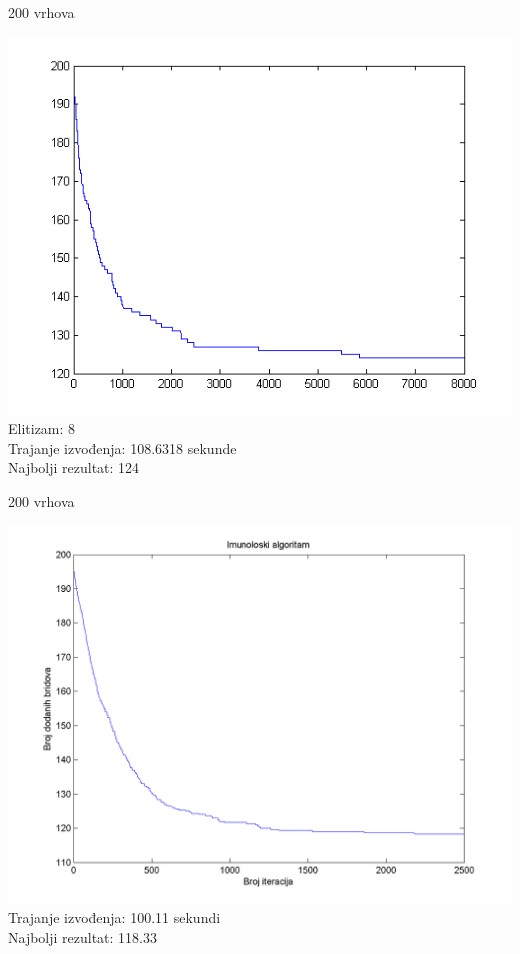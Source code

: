 \documentclass{beamer}
\begin{document}
\begin{frame}{200 vrhova}
\begin{center}
\includegraphics[scale = 0.55]{par8.png}\\
\tiny
Elitizam: 8\\
Trajanje izvođenja: 108.6318 sekunde\\
Najbolji rezultat: 124\\
\end{center}
\end{frame}

\begin{frame}{200 vrhova}
\begin{center}
\includegraphics[scale = 0.4]{Im200.png}\\
Trajanje izvođenja: 100.11 sekundi\\
Najbolji rezultat: 118.33\\
\end{center}
\end{frame}
\end{document}
